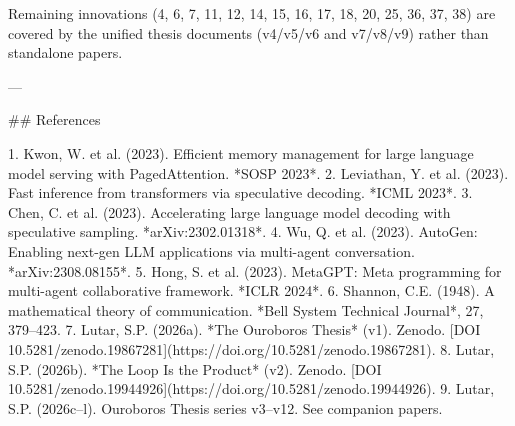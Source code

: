 Remaining innovations (4, 6, 7, 11, 12, 14, 15, 16, 17, 18, 20, 25, 36, 37, 38) are covered by the unified thesis documents (v4/v5/v6 and v7/v8/v9) rather than standalone papers.

---

## References

1. Kwon, W. et al. (2023). Efficient memory management for large language model serving with PagedAttention. *SOSP 2023*.
2. Leviathan, Y. et al. (2023). Fast inference from transformers via speculative decoding. *ICML 2023*.
3. Chen, C. et al. (2023). Accelerating large language model decoding with speculative sampling. *arXiv:2302.01318*.
4. Wu, Q. et al. (2023). AutoGen: Enabling next-gen LLM applications via multi-agent conversation. *arXiv:2308.08155*.
5. Hong, S. et al. (2023). MetaGPT: Meta programming for multi-agent collaborative framework. *ICLR 2024*.
6. Shannon, C.E. (1948). A mathematical theory of communication. *Bell System Technical Journal*, 27, 379--423.
7. Lutar, S.P. (2026a). *The Ouroboros Thesis* (v1). Zenodo. [DOI 10.5281/zenodo.19867281](https://doi.org/10.5281/zenodo.19867281).
8. Lutar, S.P. (2026b). *The Loop Is the Product* (v2). Zenodo. [DOI 10.5281/zenodo.19944926](https://doi.org/10.5281/zenodo.19944926).
9. Lutar, S.P. (2026c--l). Ouroboros Thesis series v3--v12. See companion papers.
